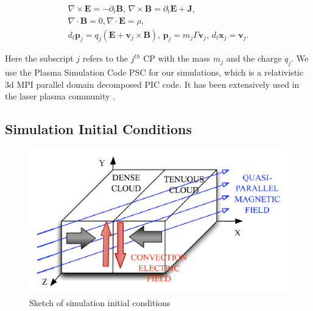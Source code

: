 \documentclass[structabstract]{aa}
\begin{document}
\begin{eqnarray}
\nabla  \times \mathbf{E} =  -\partial_t \mathbf{B}, \,
\nabla  \times \mathbf{B} =  \partial_t \mathbf{E} + \mathbf{J}, \\
\nabla  \cdot \mathbf{B} =  0, \nabla  \cdot \mathbf{E} =  \rho, \\
d_t \mathbf{p}_j = q_j \left( \mathbf{E} + \mathbf{v}_j \times \mathbf{B} \right), \,
\mathbf{p}_j=m_j \Gamma \mathbf{v}_j, \, d_t \mathbf{x}_j =\mathbf{v}_j.
\end{eqnarray}

Here the subscript $j$ refers to the $j^{th}$ CP with the mass $m_j$ and the charge $q_j$. We 
use the Plasma Simulation Code PSC for our simulations, which is a relativistic 3d MPI parallel 
domain decomposed PIC code. It has been extensively used in the laser plasma community 
\citep{Roth:2001wc, Cowan:2004ts}.

\subsection{Simulation Initial Conditions}

    \begin{figure}
   \centering
   \includegraphics[width=\columnwidth]{15294f01.png}
      \caption{Sketch of simulation initial conditions
                    }
         \label{FigInitScheme}
   \end{figure}
   
\end{document}
